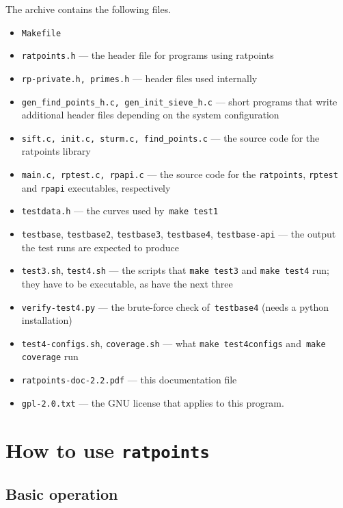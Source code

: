 \documentclass[12pt,a4paper,oneside]{amsart}
\begin{document}
The archive contains the following files.
\begin{itemize}
  \item \texttt{Makefile}
  \item \texttt{ratpoints.h} --- the header file for programs using ratpoints
  \item \texttt{rp-private.h, primes.h} --- header files used internally
  \item \texttt{gen\_find\_points\_h.c, gen\_init\_sieve\_h.c} ---
        short programs that write additional header files depending
        on the system configuration
  \item \texttt{sift.c, init.c, sturm.c, find\_points.c} ---
        the source code for the ratpoints library
  \item \texttt{main.c, rptest.c, rpapi.c} --- the source code for the
        \texttt{ratpoints}, \texttt{rptest} and \texttt{rpapi} executables,
        respectively
  \item \texttt{testdata.h} --- the curves used by~\texttt{make test1}
  \item \texttt{testbase}, \texttt{testbase2}, \texttt{testbase3},
        \texttt{testbase4}, \texttt{testbase-api} --- the output the
        test runs are expected to produce
  \item \texttt{test3.sh}, \texttt{test4.sh} --- the scripts that
        \texttt{make test3} and \texttt{make test4} run; they have to be
        executable, as have the next three
  \item \texttt{verify-test4.py} --- the brute-force check of~\texttt{testbase4}
        (needs a python installation)
  \item \texttt{test4-configs.sh}, \texttt{coverage.sh} --- what
        \texttt{make test4configs} and~\texttt{make coverage} run
  \item \texttt{ratpoints-doc-2.2.pdf} --- this documentation file
  \item \texttt{gpl-2.0.txt} --- the GNU license that applies to this program.
\end{itemize}


\section{How to use \texttt{ratpoints}}

\subsection{Basic operation}
\end{document}
